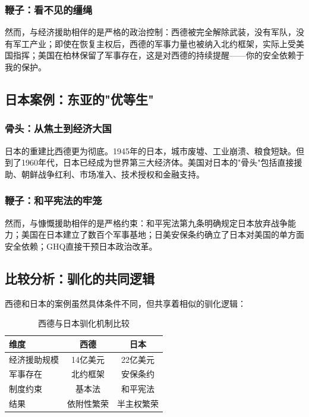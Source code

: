 \documentclass[12pt,a4paper]{article}
\begin{document}
\subsubsection{鞭子：看不见的缰绳}

然而，与经济援助相伴的是严格的政治控制：西德被完全解除武装，没有军队，没有军工产业；即使在恢复主权后，西德的军事力量也被纳入北约框架，实际上受美国指挥；美国在柏林保留了军事存在，这是对西德的持续提醒——你的安全依赖于我的保护。

\subsection{日本案例：东亚的"优等生"}

\subsubsection{骨头：从焦土到经济大国}

日本的重建比西德更为彻底。1945年的日本，城市废墟、工业崩溃、粮食短缺。但到了1960年代，日本已经成为世界第三大经济体。美国对日本的"骨头"包括直接援助、朝鲜战争红利、市场准入、技术授权和金融支持。

\subsubsection{鞭子：和平宪法的牢笼}

然而，与慷慨援助相伴的是严格约束：和平宪法第九条明确规定日本放弃战争能力；美国在日本建立了数百个军事基地；日美安保条约确立了日本对美国的单方面安全依赖；GHQ直接干预日本政治改革。

\subsection{比较分析：驯化的共同逻辑}

西德和日本的案例虽然具体条件不同，但共享着相似的驯化逻辑：

\begin{table}[h]
\centering
\begin{tabular}{lcc}
\toprule
\textbf{维度} & \textbf{西德} & \textbf{日本} \\
\midrule
经济援助规模 & 14亿美元 & 22亿美元 \\
军事存在 & 北约框架 & 安保条约 \\
制度约束 & 基本法 & 和平宪法 \\
结果 & 依附性繁荣 & 半主权繁荣 \\
\bottomrule
\end{tabular}
\caption{西德与日本驯化机制比较}
\end{table}
\end{document}
